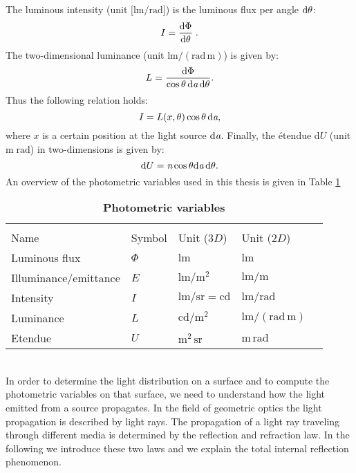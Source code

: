 The luminous intensity \big(unit $\big[\textrm{lm}/\textrm{rad}\big]$\big) is the luminous flux per angle $\textrm{d}\theta$:
 \begin{equation}
 I=\frac{\textrm{d}\Phi}{\textrm{d}\theta}\;.
 \end{equation}
 The two-dimensional luminance (unit $\textrm{lm}/(\textrm{rad}\,\textrm{m})$) is given by:
 \begin{equation}
 L= \frac{\textrm {d}\Phi}{\cos\theta\,\textrm{d}\textit{a} \,\textrm{d}\theta}.
 \end{equation}
 Thus the following relation holds:
 \begin{equation}
 I = L(x, \theta)\cos\theta\,\textrm{d}\textit{a},
 \end{equation}
where $x$ is a certain position at the light source $\textrm{d}\textit{a}$. 
 Finally, the \'{e}tendue $\textrm{d}U $ (unit $\textrm{m}\;\textrm{rad}$) in two-dimensions is given by:
\begin{equation}\label{etendue2d}
\textrm{d}U = \textit{n}\cos\theta\textrm{d}\textit{a}\,\textrm{d}\theta.
\end{equation}
An overview of the photometric variables used in this thesis is given in Table \ref{tab:photometric_variables}
\begin{table}[t] 
\centering
\caption{\bf Photometric variables}
\begin{tabular}{lllll}
 \hline   \\
Name  & Symbol & Unit ($3D$) & Unit ($2D$) \\
  \hline 
Luminous flux & $\Phi$   & $\textrm{lm}$   &  $\textrm{lm}$ \\
Illuminance/emittance  & $E$    & $\textrm{lm}/{\textrm{m}^2} $ & $\textrm{lm}/{\textrm{m}}$  \\
Intensity  & $I$    & $\textrm{lm}/{\textrm{sr}} = \textrm{cd}$  & $\textrm{lm}/\textrm{rad}$ \\
Luminance  & $L$  & $ \textrm{cd}/{\textrm{m}^2}$   & $\textrm{lm}/(\textrm{rad} \,\textrm{m})$ \\
Etendue & $U$  & $\textrm{m}^2\, \textrm{sr}$   & $\textrm{m}\, \textrm{rad}$ \\
 \hline
 \end{tabular}
\label{tab:photometric_variables}
 \end{table}
\\ \indent In order to determine the light distribution on a surface and to compute the photometric variables on that surface, we need to understand how the light emitted from a source propagates. In the field of geometric optics the light propagation is described by light rays.
The propagation of a light ray traveling through different media is determined by the reflection and refraction law.
In the following we introduce these two laws and we explain the total internal reflection phenomenon.
